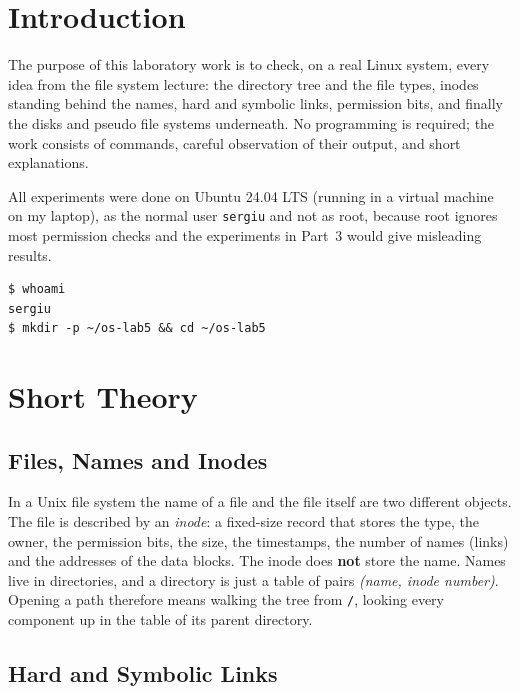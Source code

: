 \documentclass[12pt,a4paper]{article}
\begin{document}
\setcounter{page}{2}
\tableofcontents
\newpage

\section*{Introduction}

The purpose of this laboratory work is to check, on a real Linux system, every idea from the file system lecture: the directory tree and the file types, inodes standing behind the names, hard and symbolic links, permission bits, and finally the disks and pseudo file systems underneath. No programming is required; the work consists of commands, careful observation of their output, and short explanations.

All experiments were done on Ubuntu 24.04 LTS (running in a virtual machine on my laptop), as the normal user \texttt{sergiu} and not as root, because root ignores most permission checks and the experiments in Part~3 would give misleading results.

\begin{lstlisting}[style=terminal,caption={Preparing the working directory}]
$ whoami
sergiu
$ mkdir -p ~/os-lab5 && cd ~/os-lab5
\end{lstlisting}

\newpage
\section{Short Theory}

\subsection{Files, Names and Inodes}

In a Unix file system the name of a file and the file itself are two different objects. The file is described by an \textit{inode}: a fixed-size record that stores the type, the owner, the permission bits, the size, the timestamps, the number of names (links) and the addresses of the data blocks. The inode does \textbf{not} store the name. Names live in directories, and a directory is just a table of pairs \textit{(name, inode number)}. Opening a path therefore means walking the tree from \texttt{/}, looking every component up in the table of its parent directory.

\subsection{Hard and Symbolic Links}
\end{document}
